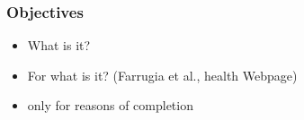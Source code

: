 \subsubsection{Objectives}

\begin{itemize}
	\item What is it?
	\item For what is it?  {\color{red} (Farrugia et al., health Webpage)}
	\item only for reasons of completion
\end{itemize}